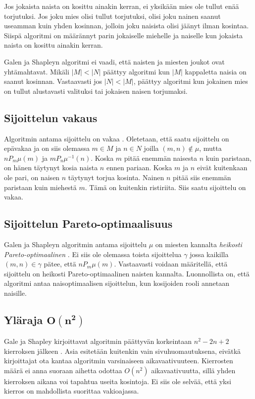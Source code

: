 \documentclass[gradu, twoside]{tktltiki}
\begin{document}
Jos jokaista naista on kosittu ainakin kerran, ei yksikään mies ole
tullut enää torjutuksi. Jos joku mies olisi tullut torjutuksi, olisi
joku nainen saanut useamman kuin yhden kosinnan, jolloin joku naisista
olisi jäänyt ilman kosintaa. Siispä algoritmi on määrännyt parin
jokaiselle miehelle ja naiselle kun jokaista naista on kosittu ainakin
kerran.

Galen ja Shapleyn algoritmi ei vaadi, että naisten ja miesten joukot
ovat yhtämahtavat. Mikäli $|M| < |N|$ päättyy algoritmi kun $|M|$
kappaletta naisia on saanut kosinnan. Vastaavasti jos $|N| < |M|$,
päättyy algoritmi kun jokainen mies on tullut alustavasti valituksi
tai jokaisen naisen torjumaksi. \cite{galeshapley62}

\subsection{Sijoittelun vakaus}

Algoritmin antama sijoittelu on vakaa \cite{galeshapley62}. Oletetaan,
että saatu sijoittelu on epävakaa ja on siis olemassa $m \in M$ ja $n
\in N$ joilla $(m, n) \notin \mu$, mutta $nP_m\mu(m)$ ja
$mP_n\mu^{-1}(n)$. Koska $m$ pitää enemmän naisesta $n$ kuin
paristaan, on hänen täytynyt kosia naista $n$ ennen pariaan. Koska $m$
ja $n$ eivät kuitenkaan ole pari, on naisen $n$ täytynyt torjua
kosinta. Nainen $n$ pitää siis enemmän paristaan kuin miehestä $m$.
Tämä on kuitenkin ristiriita. Siis saatu sijoittelu on vakaa.

\subsection{Sijoittelun Pareto-optimaalisuus}

Galen ja Shapleyn algoritmin antama sijoittelu $\mu$ on miesten
kannalta \emph{heikosti Pareto-optimaalinen} \cite{gusfield89}. Ei
siis ole olemassa toista sijoittelua $\gamma$ jossa kaikilla $(m, n)
\in \gamma$ pätee, että $nP_m\mu(m)$. Vastaavasti voidaan määritellä,
että sijoittelu on heikosti Pareto-optimaalinen naisten kannalta.
Luonnollista on, että algoritmi antaa naisoptimaalisen sijoittelun,
kun kosijoiden rooli annetaan naisille.

\subsection{Yläraja $\boldsymbol{O(n^2)}$}

Gale ja Shapley kirjoittavat algoritmin päättyvän korkeintaan $n^2 -
2n + 2$ kierroksen jälkeen \cite{galeshapley62}. Asia esitetään
kuitenkin vain sivuhuomautuksena, eivätkä kirjoittajat ota kantaa
algoritmin varsinaiseen aikavaativuuteen. Kierrosten määrä ei anna
suoraan aihetta odottaa $O(n^2)$ aikavaativuutta, sillä yhden
kierroksen aikana voi tapahtua useita kosintoja. Ei siis ole selvää,
että yksi kierros on mahdollista suorittaa vakioajassa.
\end{document}
